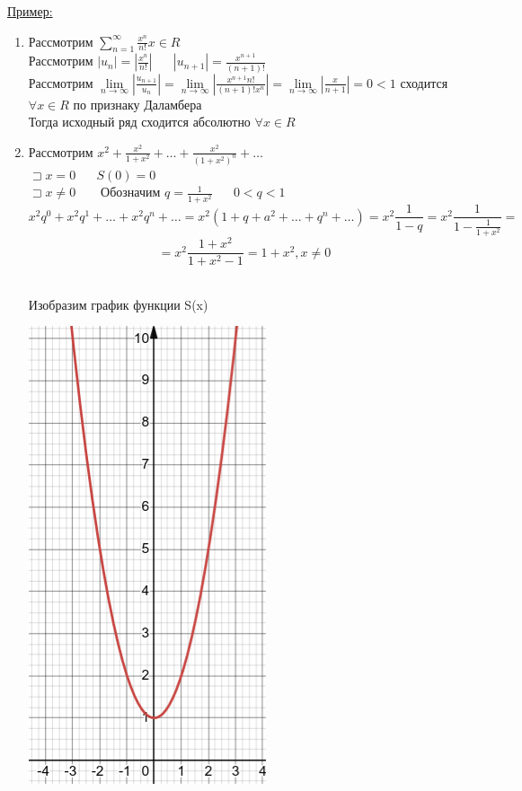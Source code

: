 \documentclass[12pt]{article}
\let\ORIincludegraphics\includegraphics
\renewcommand{\includegraphics}[2][]{\ORIincludegraphics[scale=0.65,#1]{#2}}
\let\oldsum\sum
\let\oldlim\lim
\renewcommand{\sum}{\oldsum\limits}
\renewcommand{\lim}{\oldlim\limits}
\begin{document}
  \underline{Пример:}
  \begin{enumerate}
    \item Рассмотрим $\sum_{n=1}^{\infty} \frac{x^n}{n!} x \in R$ \\%
    Рассмотрим $|u_n| = |\frac{x^n}{n!}| \hspace{20pt} |u_{n+1}|=\frac{x^{n+1}}{(n+1)!}$\\
    Рассмотрим $\lim_{n \to \infty} |\frac{u_{n+1}}{u_n}| = \lim_{n \to \infty} |\frac{x^{n+1}n!}{(n+1)!x^n}|=
    \lim_{n \to \infty}|\frac{x}{n+1}| = 0 < 1$ сходится $\forall x \in R$ по признаку Даламбера\\
    Тогда исходный ряд сходится абсолютно $\forall x \in R$
    \item Рассмотрим $x^2+\frac{x^2}{1+x^2}+\dots+\frac{x^2}{(1+x^2)^n}+\dots$\\
    $\sqsupset x=0 \hspace{20pt} S(0)=0$\\
    $\sqsupset x\not = 0 \hspace{20pt} \text{ Обозначим } q = \frac{1}{1+x^2} \hspace{20pt} 0<q<1$
    \[x^2q^0+x^2q^1+\dots+x^2q^n+\dots=x^2(1+q+a^2+\dots+q^n+\dots)=x^2\frac{1}{1-q}=x^2 \frac{1}{1-\frac{1}{1+x^2}}
    =\]
    \[= x^2  \frac{1+x^2}{1+x^2-1}=1+x^2, x \not = 0\]\\
    \pagebreak

    Изобразим график функции S(x)
    \begin{center}
      \includegraphics[scale=0.5]{10.9.1.png}
    \end{center}


\end{enumerate}
\end{document}
